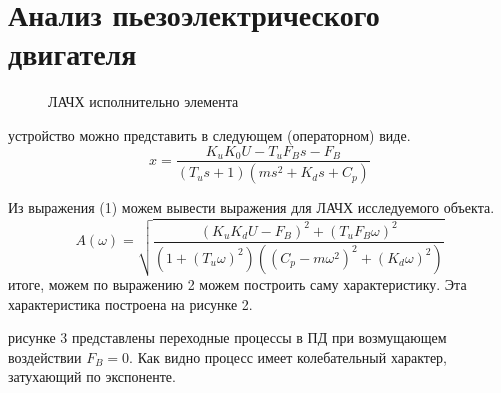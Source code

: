 \documentclass[a4paper, 12pt]{article}
\begin{document}
\newpage
\section{Анализ пьезоэлектрического двигателя}

\hspace*{-\parindent}%
\begin{minipage}{0.4\textwidth}
    \begin{figure}[H]
        \centering
        \caption{ЛАЧХ исполнительно элемента}
    \end{figure}
\end{minipage}
\hspace{0.03\textwidth}
\begin{minipage}{0.57\textwidth}
     устройство можно представить в следующем (операторном) виде.
    \begin{equation}
        x = \frac{K_uK_0U - T_uF_Bs - F_B}{(T_us+1)(ms^2 + K_ds + C_p)}
    \end{equation} 
    \par Из выражения (1) можем вывести выражения для ЛАЧХ исследуемого объекта.
    \begin{equation}
        A(\omega) = \sqrt{\frac{(K_uK_dU - F_B)^2 + (T_uF_B\omega)^2}{(1 + (T_u\omega)^2)((C_p - m\omega^2)^2 + (K_d\omega)^2)}}
    \end{equation}
     итоге, можем по выражению 2 можем построить саму характеристику. Эта характеристика построена на рисунке 2.
\end{minipage}
\vspace{0.5cm}
 рисунке 3 представлены переходные процессы в ПД при возмущающем воздействии $F_B = 0$. Как видно процесс имеет колебательный характер, затухающий по экспоненте.
\end{document}
